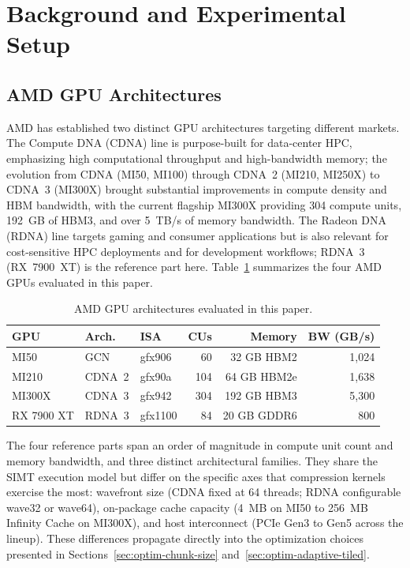 \section{Background and Experimental Setup}
\label{sec:background}

\subsection{AMD GPU Architectures}
\label{sec:bg-amd}

AMD has established two distinct GPU architectures targeting
different markets. The Compute DNA (CDNA) line is purpose-built for
data-center HPC, emphasizing high computational throughput and
high-bandwidth memory; the evolution from CDNA (MI50, MI100)
through CDNA~2 (MI210, MI250X) to CDNA~3 (MI300X) brought
substantial improvements in compute density and HBM bandwidth, with
the current flagship MI300X providing 304 compute units, 192~GB of
HBM3, and over 5~TB/s of memory bandwidth. The Radeon DNA (RDNA)
line targets gaming and consumer applications but is also relevant
for cost-sensitive HPC deployments and for development workflows;
RDNA~3 (RX~7900~XT) is the reference part here. Table~\ref{tab:gpus}
summarizes the four AMD GPUs evaluated in this paper.

\begin{table}[t]
\centering
\caption{AMD GPU architectures evaluated in this paper.}
\label{tab:gpus}
\footnotesize
\begin{tabular}{lllrrr}
\toprule
\textbf{GPU} & \textbf{Arch.} & \textbf{ISA} & \textbf{CUs} & \textbf{Memory} & \textbf{BW (GB/s)} \\
\midrule
MI50       & GCN    & gfx906  &  60 & 32 GB HBM2  & 1{,}024 \\
MI210      & CDNA~2 & gfx90a  & 104 & 64 GB HBM2e & 1{,}638 \\
MI300X     & CDNA~3 & gfx942  & 304 & 192 GB HBM3 & 5{,}300 \\
RX 7900 XT & RDNA~3 & gfx1100 &  84 & 20 GB GDDR6 &   800  \\
\bottomrule
\end{tabular}
\end{table}

The four reference parts span an order of magnitude in compute unit
count and memory bandwidth, and three distinct architectural
families. They share the SIMT execution model but differ on the
specific axes that compression kernels exercise the most: wavefront
size (CDNA fixed at 64 threads; RDNA configurable wave32 or wave64),
on-package cache capacity (4~MB on MI50 to 256~MB Infinity Cache on
MI300X), and host interconnect (PCIe Gen3 to Gen5 across the
lineup). These differences propagate directly into the
optimization choices presented in Sections~\ref{sec:optim-chunk-size}
and~\ref{sec:optim-adaptive-tiled}.

